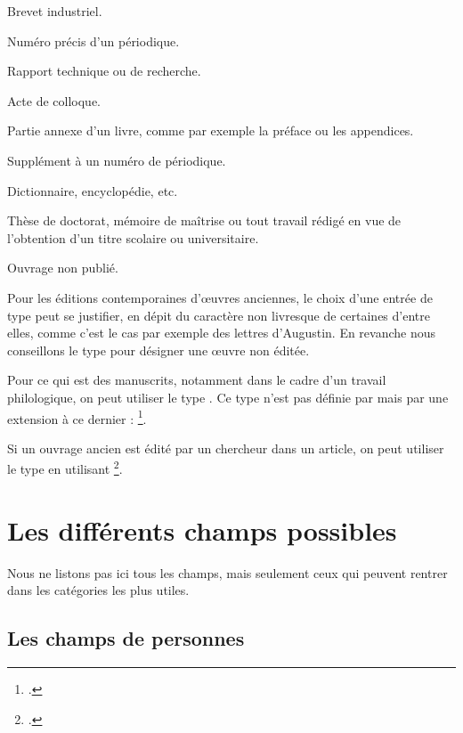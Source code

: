 \begin{choix}
	\item[\type{patent}]
	Brevet industriel.
	\item[\type{periodical}]
	Numéro précis d'un périodique.	
	\item[\type{report}]	
	Rapport technique ou de recherche.
	\item[\type{proceedings}]
	Acte de colloque.
	\item[\type{suppbook}]
	Partie annexe d'un livre, comme par exemple la préface ou les appendices.
	\item[\type{supperiodical}]
	Supplément à un numéro de périodique.
	\item[\type{reference}]
	Dictionnaire, encyclopédie, etc.
	\item[\type{thesis}]
	Thèse de doctorat, mémoire de maîtrise ou tout travail rédigé en vue de l'obtention d'un titre scolaire ou universitaire.
	\item[\type{unpublished}]
	Ouvrage non publié.
\end{choix}

Pour les éditions contemporaines d'œuvres anciennes, le choix d'une entrée de type  peut se justifier, en dépit du caractère non livresque de certaines d'entre elles, comme c'est le cas par exemple des lettres d'Augustin. En revanche  nous conseillons le type  pour désigner  une œuvre non éditée. 

\begin{plusloins}
Pour ce qui est des manuscrits, notamment dans le cadre d'un travail philologique, on peut utiliser le type . Ce type n'est pas définie par  mais par une extension à ce dernier : \footcite{biblatex-manuscripts-philology}.

Si un ouvrage ancien est édité par un chercheur dans un article, on peut utiliser le type  en utilisant \footcite{biblatex-bookinarticle}.
\end{plusloins}

\section{Les différents champs possibles}

Nous ne listons pas ici tous les champs, mais seulement ceux qui peuvent rentrer dans les catégories les plus utiles.
\subsection{Les champs de personnes}

